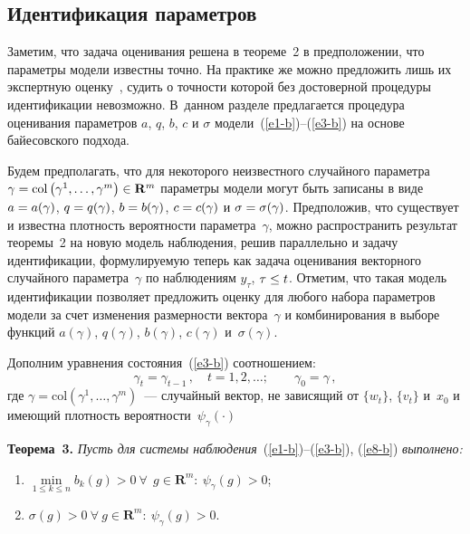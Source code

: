 \begin{multicols}{2}
\section{Идентификация параметров}

  Заметим, что задача оценивания решена в тео\-ре\-ме~2 в предположении, что параметры 
модели известны точно. На практике же можно предложить лишь их экспертную 
оценку~\cite{19-b}, судить о точности которой без достоверной процедуры идентификации 
невозможно. В~данном разделе предлагается процедура оценивания параметров $a$, $q$, 
$b$, $c$ и $\sigma$ модели~(\ref{e1-b})--(\ref{e3-b}) на основе байесовского подхода.
  
  Будем предполагать, что для некоторого неизвестного случайного параметра $\gamma 
\hm=\mathrm{col}\left( \gamma^1, \ldots ,\gamma^m\right)\in \mathbf{R}^m$ параметры модели могут быть 
записаны в виде $a\hm =a(\gamma)$, $q\hm =q(\gamma)$, $b\hm =b(\gamma)$, $c\hm 
=c(\gamma)$ и $\sigma\hm =\sigma(\gamma)$. Предположив, что существует и известна 
плотность вероятности параметра~$\gamma$, можно распространить результат теоремы~2 на 
новую модель наблюдения, решив параллельно и задачу идентификации, формулируемую 
теперь как задача оценивания векторного случайного параметра~$\gamma$ по наблюдениям 
$y_\tau$, $\tau\hm\leq t$. Отметим, что такая модель идентификации позволяет предложить 
оценку для любого набора параметров модели за счет изменения размерности 
вектора~$\gamma$ и комбинирования в выборе функций $ a(\gamma)$, $ q(\gamma)$, $ 
b(\gamma)$, $c(\gamma)$ и~$\sigma(\gamma)$. 
  
  Дополним уравнения состояния~(\ref{e3-b}) соотношением:
  \begin{equation}
  \gamma_t=\gamma_{t-1}\,,\quad t=1,2, \ldots; \qquad \gamma_0=\gamma\,,
  \label{e8-b}
  \end{equation}
где $\gamma =\mathrm{col}\left( \gamma^1, \ldots , \gamma^m\right)$~--- случайный вектор, не 
зависящий от $\{w_t\}$, $\{v_t\}$ и~$x_0$ и имеющий плотность 
вероятности~$\psi_\gamma(\cdot)$ 
  
  \smallskip
  
  \noindent
  \textbf{Теорема~3.} \textit{Пусть для сис\-те\-мы наблюдения}~(\ref{e1-b})--(\ref{e3-b}), 
(\ref{e8-b}) \textit{выполнено:}
  \begin{enumerate}[(1)]
  \item $\min\limits_{1\leq k\leq n} b_k(g)>0 \ \forall\ \ g\in \mathbf{R}^m:\ \psi_\gamma(g)>0$;
  \item $\sigma(g)>0\ \forall\ g\in \mathbf{R}^m:\ \psi_\gamma(g)>0$.
  \end{enumerate}
  

\end{multicols}
